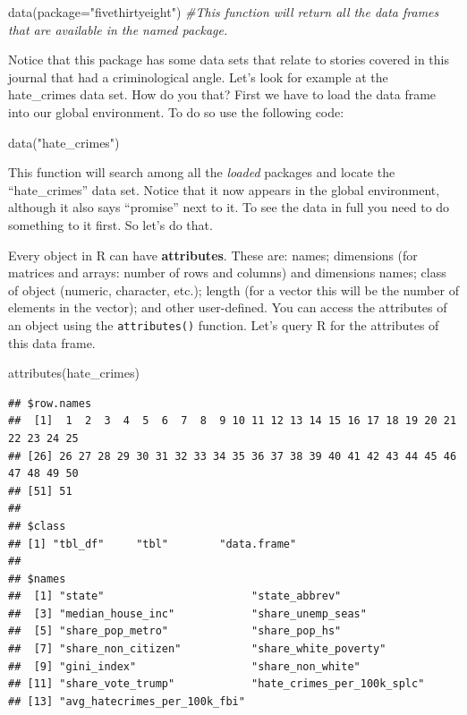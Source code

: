 \documentclass[
]{book}
\newenvironment{Shaded}{\begin{snugshade}}{\end{snugshade}}
\newcommand{\AttributeTok}[1]{\textcolor[rgb]{0.77,0.63,0.00}{#1}}
\newcommand{\CommentTok}[1]{\textcolor[rgb]{0.56,0.35,0.01}{\textit{#1}}}
\newcommand{\FunctionTok}[1]{\textcolor[rgb]{0.00,0.00,0.00}{#1}}
\newcommand{\NormalTok}[1]{#1}
\newcommand{\StringTok}[1]{\textcolor[rgb]{0.31,0.60,0.02}{#1}}
\begin{document}
\begin{Shaded}
\begin{Highlighting}[]
\FunctionTok{data}\NormalTok{(}\AttributeTok{package=}\StringTok{"fivethirtyeight"}\NormalTok{) }\CommentTok{\#This function will return all the data frames that are available in the named package.}
\end{Highlighting}
\end{Shaded}

Notice that this package has some data sets that relate to stories covered in this journal that had a criminological angle. Let's look for example at the hate\_crimes data set. How do you that? First we have to load the data frame into our global environment. To do so use the following code:

\begin{Shaded}
\begin{Highlighting}[]
\FunctionTok{data}\NormalTok{(}\StringTok{"hate\_crimes"}\NormalTok{)}
\end{Highlighting}
\end{Shaded}

This function will search among all the \emph{loaded} packages and locate the ``hate\_crimes'' data set. Notice that it now appears in the global environment, although it also says ``promise'' next to it. To see the data in full you need to do something to it first. So let's do that.

Every object in R can have \textbf{attributes}. These are: names; dimensions (for matrices and arrays: number of rows and columns) and dimensions names; class of object (numeric, character, etc.); length (for a vector this will be the number of elements in the vector); and other user-defined. You can access the attributes of an object using the \texttt{attributes()} function. Let's query R for the attributes of this data frame.

\begin{Shaded}
\begin{Highlighting}[]
\FunctionTok{attributes}\NormalTok{(hate\_crimes)}
\end{Highlighting}
\end{Shaded}

\begin{verbatim}
## $row.names
##  [1]  1  2  3  4  5  6  7  8  9 10 11 12 13 14 15 16 17 18 19 20 21 22 23 24 25
## [26] 26 27 28 29 30 31 32 33 34 35 36 37 38 39 40 41 42 43 44 45 46 47 48 49 50
## [51] 51
## 
## $class
## [1] "tbl_df"     "tbl"        "data.frame"
## 
## $names
##  [1] "state"                       "state_abbrev"               
##  [3] "median_house_inc"            "share_unemp_seas"           
##  [5] "share_pop_metro"             "share_pop_hs"               
##  [7] "share_non_citizen"           "share_white_poverty"        
##  [9] "gini_index"                  "share_non_white"            
## [11] "share_vote_trump"            "hate_crimes_per_100k_splc"  
## [13] "avg_hatecrimes_per_100k_fbi"
\end{verbatim}
\end{document}
